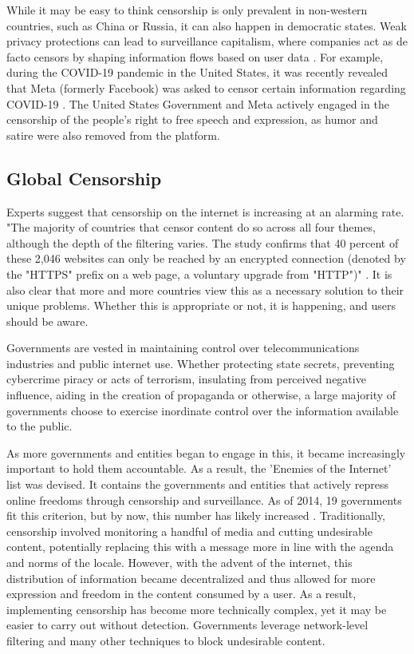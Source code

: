 While it may be easy to think censorship is only prevalent in non-western countries, such as China or Russia, it can also happen in democratic states. Weak privacy protections can lead to surveillance capitalism, where companies act as de facto censors by shaping information flows based on user data \cite{schwartz1999internet}. For example, during the COVID-19 pandemic in the United States, it was recently revealed that Meta (formerly Facebook) was asked to censor certain information regarding COVID-19 \cite{pbsZuckerbergSays}. The United States Government and Meta actively engaged in the censorship of the people's right to free speech and expression, as humor and satire were also removed from the platform.

\subsection{Global Censorship}
\label{sec:Chris-Global-Censorship}

Experts suggest that censorship on the internet is increasing at an alarming rate. "The majority of countries that censor content do so across all four themes, although the depth of the filtering varies. The study confirms that 40 percent of these 2,046 websites can only be reached by an 
encrypted connection (denoted by the "HTTPS" prefix on a web page, a voluntary upgrade from "HTTP")" \cite{zittrain2017shifting}. It is also clear that more and more countries view this as a necessary solution to their unique problems. Whether this is appropriate or not, it is happening, and users should be aware. 

Governments are vested in maintaining control over telecommunications industries and public internet use. Whether protecting state secrets, preventing cybercrime piracy or acts of terrorism, insulating from perceived negative influence, aiding in the creation of propaganda or otherwise, a large majority of governments choose to exercise inordinate control over the 
information available to the public.  

As more governments and entities began to engage in this, it became increasingly important to hold them accountable. As a result, the 'Enemies of the Internet' list was devised. It contains the governments and entities that actively repress online freedoms through censorship and surveillance. As of 2014, 19 governments fit this criterion, but by now, this number has likely increased \cite{GlobalCensorshipRef2}. Traditionally, censorship involved monitoring a handful of media and cutting undesirable content, potentially replacing this with a message more in line with the agenda and norms of the locale. However, with the advent of the internet, this distribution of information became decentralized and thus allowed for more expression and freedom in the content consumed by a user. As a result, implementing censorship has become more technically complex, yet it may be easier to carry out without detection. Governments leverage network-level filtering and many other techniques to block undesirable content.


